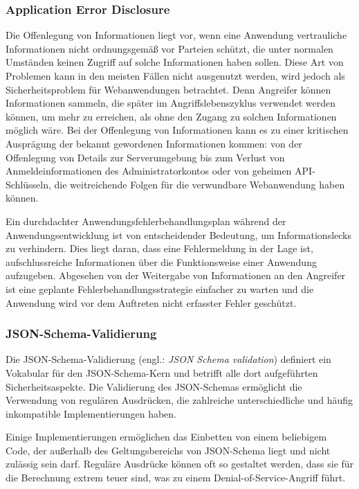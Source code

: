 \subsubsection{Application Error Disclosure}

Die Offenlegung von Informationen liegt vor, wenn eine Anwendung vertrauliche Informationen nicht ordnungsgemäß vor Parteien schützt, die unter normalen Umständen keinen Zugriff auf solche Informationen haben sollen. Diese Art von Problemen kann in den meisten Fällen nicht ausgenutzt werden, wird jedoch als Sicherheitsproblem für Webanwendungen betrachtet. Denn Angreifer können Informationen sammeln, die später im Angriffslebenszyklus verwendet werden können, um mehr zu erreichen, als ohne den Zugang zu solchen Informationen möglich wäre. Bei der Offenlegung von Informationen kann es zu einer kritischen Ausprägung der bekannt gewordenen Informationen kommen: von der Offenlegung von Details zur Serverumgebung bis zum Verlust von Anmeldeinformationen des Administratorkontos oder von geheimen API-Schlüsseln, die weitreichende Folgen für die verwundbare Webanwendung haben können\cite{infdiscissattack17}.

Ein durchdachter Anwendungsfehlerbehandlungsplan während der Anwendungsentwicklung ist von entscheidender Bedeutung, um Informationslecks zu verhindern. Dies liegt daran, dass eine Fehlermeldung in der Lage ist, aufschlussreiche Informationen über die Funktionsweise einer Anwendung aufzugeben. Abgesehen von der Weitergabe von Informationen an den Angreifer ist eine geplante Fehlerbehandlungsstrategie einfacher zu warten und die Anwendung wird vor dem Auftreten nicht erfasster Fehler geschützt\cite{ase17}.

\subsubsection{JSON-Schema-Validierung}

Die JSON-Schema-Validierung (engl.: \textit{JSON Schema validation}) definiert ein Vokabular für den JSON-Schema-Kern und betrifft alle dort aufgeführten Sicherheitsaspekte. Die Validierung des JSON-Schemas ermöglicht die Verwendung von regulären Ausdrücken, die zahlreiche unterschiedliche und häufig inkompatible Implementierungen haben.

Einige Implementierungen ermöglichen das Einbetten von einem beliebigem Code, der außerhalb des Geltungsbereichs von JSON-Schema liegt und nicht zulässig sein darf. Reguläre Ausdrücke können oft so gestaltet werden, dass sie für die Berechnung extrem teuer sind, was zu einem Denial-of-Service-Angriff führt.

